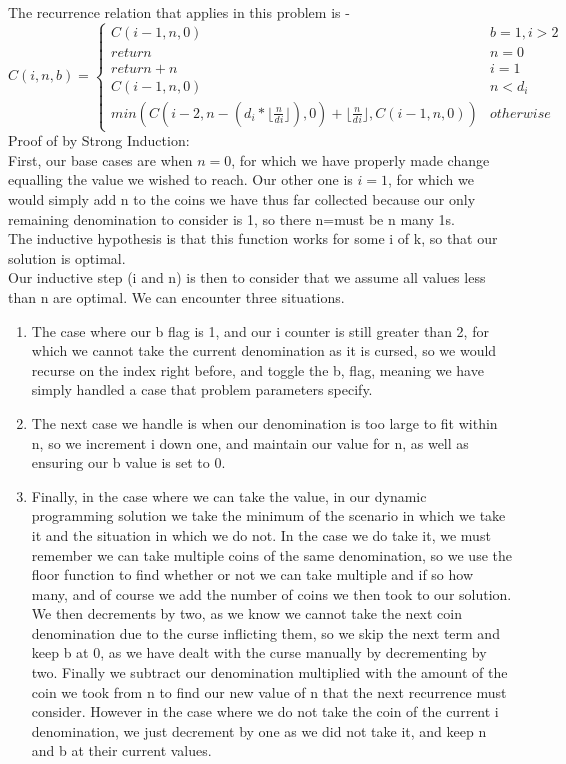 \documentclass[12pt]{article}
\begin{document}
\begin{enumerate}
\begin{enumerate}
        The recurrence relation that applies in this problem is -\\
        $$C(i,n,b) =  \begin{cases} 
            C(i-1,n,0) & b = 1, i > 2 \\
            return & n = 0\\
            return + n & i = 1\\
            C(i-1,n,0) & n < d_{i}\\
            min(C(i-2,n-(d_{i}* \lfloor \frac{n}{d_{}i} \rfloor),0) + \lfloor \frac{n}{d_{}i} \rfloor, C(i-1,n,0)) & otherwise  
            \end{cases}$$
        Proof of by Strong Induction:\\
        First, our base cases are when $n = 0$, for which we have properly made change equalling the value we wished to reach. Our other one is $i=1$, for which we would simply add n to the coins we have thus far collected because our only remaining denomination to consider is 1, so there n=must be n many 1s.\\
        The inductive hypothesis is that this function works for some i of k, so that our solution is optimal.\\
        Our inductive step (i and n) is then to consider that we assume all values less than n are optimal. We can encounter three situations.\\
        \begin{enumerate}
            \item The case where our b flag is 1, and our i counter is still greater than 2, for which we cannot take the current denomination as it is cursed, so we would recurse on the index right before, and toggle the b, flag, meaning we have simply handled a case that problem parameters specify.
            \item The next case we handle is when our denomination is too large to fit within n, so we increment i down one, and maintain our value for n, as well as ensuring our b value is set to 0.
            \item Finally, in the case where we can take the value, in our dynamic programming solution we take the minimum of the scenario in which we take it and the situation in which we do not. In the case we do take it, we must remember we can take multiple coins of the same denomination, so we use the floor function to find whether or not we can take multiple and if so how many, and of course we add the number of coins we then took to our solution. We then decrements by two, as we know we cannot take the next coin denomination due to the curse inflicting them, so we skip the next term and keep b at 0, as we have dealt with the curse manually by decrementing by two. Finally we subtract our denomination multiplied with the amount of the coin we took from n to find our new value of n that the next recurrence must consider. However in the case where we do not take the coin of the current i denomination, we just decrement by one as we did not take it, and keep n and b at their current values.\\
        \end{enumerate}
        

\end{enumerate}
\end{enumerate}
\end{document}
